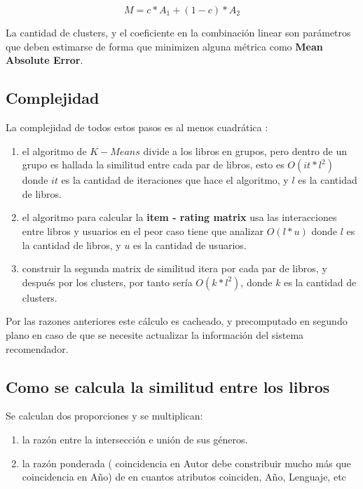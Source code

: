\documentclass[14pt]{extarticle}
\begin{document}
$$M = c * A_1 + (1-c) * A_2$$

La cantidad de clusters, y el coeficiente en la combinación linear son parámetros que deben estimarse de forma que minimizen alguna métrica como \textbf{Mean Absolute Error}.

\subsection{Complejidad}

La complejidad de todos estos pasos es al menos cuadrática : 

\begin{enumerate}
    \item el algoritmo de $K-Means$ divide a los libros en grupos, pero dentro de un  grupo es hallada la similitud entre cada par de libros, esto es $O(it * l^2)$ donde $it$ es la cantidad de iteraciones que hace el algoritmo, y $l$ es la cantidad de libros.

    \item el algoritmo para calcular la \textbf{item - rating matrix} usa las interacciones entre libros y usuarios en el peor caso tiene que analizar $O(l * u)$ donde $l$ es la cantidad de libros, y $u$ es la cantidad de usuarios.
    
    \item construir la segunda matrix de similitud itera por cada par de libros, y después por los clusters, por tanto sería $O( k * l^2)$, donde $k$ es la cantidad de clusters.
\end{enumerate}
     
Por las razones anteriores este cálculo es cacheado, y precomputado en segundo plano en caso de que se necesite actualizar la información del sistema recomendador.

\subsection{Como se calcula la similitud entre los libros}
Se calculan dos proporciones y se multiplican:

\begin{enumerate}
    \item la razón entre la intersección e unión de sus géneros.
    \item la razón ponderada ( coincidencia en Autor debe constribuir mucho más que coincidencia en Año) de en cuantos atributos coinciden, Año, Lenguaje, etc
\end{enumerate}
\end{document}

